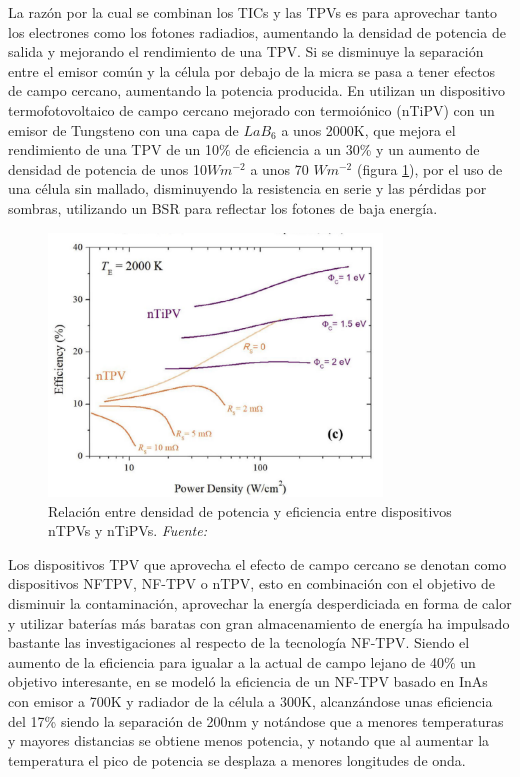 La razón por la cual se combinan los TICs y las TPVs es para aprovechar tanto los electrones como los fotones radiadios, aumentando la densidad de potencia de salida y mejorando el rendimiento de una TPV. Si se disminuye la separación entre el emisor común y la célula por debajo de la micra se pasa a tener efectos de campo cercano, aumentando la potencia producida. En \cite{thermoionic_TPV_NF} utilizan un dispositivo termofotovoltaico de campo cercano mejorado con termoiónico (nTiPV) con un emisor de Tungsteno con una capa de $LaB_6$ a unos 2000K, que mejora el rendimiento de una TPV de un 10\% de eficiencia a un 30\% y un aumento de densidad de potencia de unos 10$Wm^{-2}$ a unos 70 $Wm^{-2}$ (figura \ref{fig:PowerDensityVSEfficiency_nTiPV}), por el uso de una célula sin mallado, disminuyendo la resistencia en serie y las pérdidas por sombras, utilizando un BSR para reflectar los fotones de baja energía.\\
\begin{figure}[H]
	\centering
		\includegraphics[height=7cm]{figuras/PowerDensityVSEfficiency_nTiPV.png}
	\caption{Relación entre densidad de potencia y eficiencia entre dispositivos nTPVs y nTiPVs. \textit{Fuente: \cite{thermoionic_TPV_NF}}}
	\label{fig:PowerDensityVSEfficiency_nTiPV}
\end{figure}

Los dispositivos TPV que aprovecha el efecto de campo cercano se denotan como dispositivos NFTPV, NF-TPV o nTPV, esto en combinación con el objetivo de disminuir la contaminación, aprovechar la energía desperdiciada en forma de calor y utilizar baterías más baratas con gran almacenamiento de energía ha impulsado bastante las investigaciones al respecto de la tecnología NF-TPV. Siendo el aumento de la eficiencia para igualar a la actual de campo lejano de 40\% \cite{thermophotovoltaic_40} un objetivo interesante, en \cite{modelEfficiency_NF_TPV} se modeló la eficiencia de un NF-TPV basado en InAs con emisor a  700K y radiador de la célula a 300K, alcanzándose unas eficiencia del 17\% siendo la separación de 200nm y notándose que a menores temperaturas y mayores distancias se obtiene menos potencia, y notando que al aumentar la temperatura el pico de potencia se desplaza a menores longitudes de onda.\\

